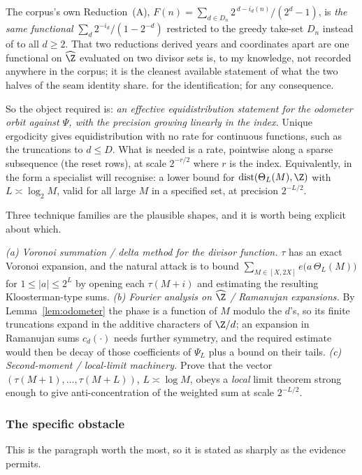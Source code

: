 The corpus's own Reduction~(A), $F(n)=\sum_{d\in D_n} 2^{\,d-i_d(n)}/(2^d-1)$,
is \emph{the same functional} $\sum_d 2^{-i_d}/(1-2^{-d})$ restricted to the greedy take-set
$D_n$ instead of to all $d\ge2$. That two reductions derived years and coordinates apart are one
functional on $\widehat{\Z}$ evaluated on two divisor sets is, to my knowledge, not recorded
anywhere in the corpus; it is the cleanest available statement of what the two halves of the seam
identity share.  for the identification;  for any consequence.

So the object required is: \emph{an effective equidistribution statement for the odometer orbit
against $\Psi$, with the precision growing linearly in the index.} Unique ergodicity gives
equidistribution with no rate for continuous functions, such as the truncations to $d\le D$. What is needed is a rate, pointwise along a sparse subsequence
(the reset rows), at scale $2^{-r/2}$ where $r$ is the index. Equivalently, in the form a
specialist will recognise: a lower bound for $\mathrm{dist}(\Theta_L(M),\Z)$ with
$L\asymp \log_2 M$, valid for all large $M$ in a specified set, at precision $2^{-L/2}$.

Three technique families are the plausible shapes, and it is worth being explicit about which.

\emph{(a) Voronoi summation / delta method for the divisor function.} $\tau$ has an exact Voronoi
expansion, and the natural attack is to bound
$\sum_{M\in[X,2X]} e\bigl(a\,\Theta_L(M)\bigr)$ for $1\le|a|\le 2^{L}$ by opening each
$\tau(M+i)$ and estimating the resulting Kloosterman-type sums. \emph{(b) Fourier analysis on
$\widehat{\Z}$ / Ramanujan expansions.} By Lemma~\ref{lem:odometer} the phase is a function of
$M$ modulo the $d$'s, so its finite truncations expand in the additive characters of $\Z/d$;
an expansion in Ramanujan sums $c_d(\cdot)$ needs further symmetry, and the required estimate would
then be decay of those coefficients of $\Psi_L$ plus a bound on their tails. \emph{(c) Second-moment / local-limit machinery.} Prove
that the vector $(\tau(M+1),\dots,\tau(M+L))$, $L\asymp\log M$, obeys a \emph{local} limit
theorem strong enough to give anti-concentration of the weighted sum at scale $2^{-L/2}$.

\subsubsection*{The specific obstacle}

This is the paragraph worth the most, so it is stated as sharply as the evidence permits.

